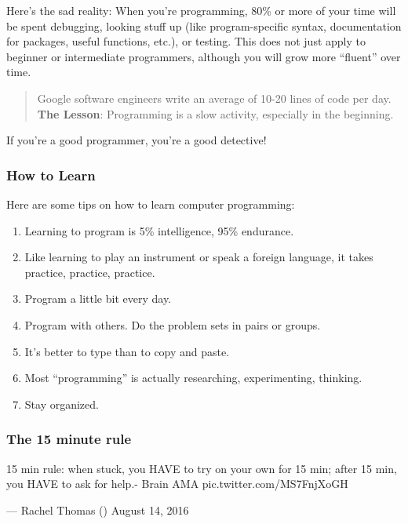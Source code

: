 \documentclass[]{book}
\begin{document}
Here's the sad reality: When you're programming, 80\% or more of your
time will be spent debugging, looking stuff up (like program-specific
syntax, documentation for packages, useful functions, etc.), or testing.
This does not just apply to beginner or intermediate programmers,
although you will grow more ``fluent'' over time.

\begin{quote}
Google software engineers write an average of 10-20 lines of code per
day. \textbf{The Lesson}: Programming is a slow activity, especially in
the beginning.
\end{quote}

If you're a good programmer, you're a good detective!

\subsubsection*{How to Learn}\label{how-to-learn}

Here are some tips on how to learn computer programming:

\begin{enumerate}
\def\labelenumi{\arabic{enumi}.}
\item
  Learning to program is 5\% intelligence, 95\% endurance.
\item
  Like learning to play an instrument or speak a foreign language, it
  takes practice, practice, practice.
\item
  Program a little bit every day.
\item
  Program with others. Do the problem sets in pairs or groups.
\item
  It's better to type than to copy and paste.
\item
  Most ``programming'' is actually researching, experimenting, thinking.
\item
  Stay organized.
\end{enumerate}

\subsubsection*{The 15 minute rule}\label{the-15-minute-rule}

15 min rule: when stuck, you HAVE to try on your own for 15 min; after
15 min, you HAVE to ask for help.- Brain AMA pic.twitter.com/MS7FnjXoGH

--- Rachel Thomas (\citet{math_rachel}) August 14, 2016
\end{document}
